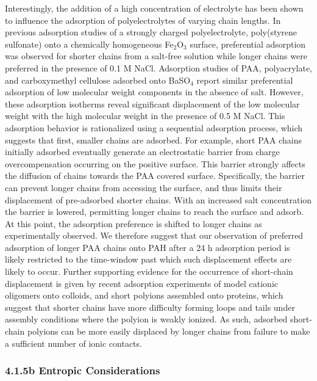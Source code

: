 \documentclass[journal=mamobx,manuscript=article]{achemso}
\begin{document}
Interestingly, the addition of a high concentration of electrolyte has been shown to influence the adsorption of polyelectrolytes of varying chain lengths.  In previous adsorption studies of a strongly charged polyelectrolyte, poly(styrene sulfonate) onto a chemically homogeneous Fe$_2$O$_3$ surface, preferential adsorption was observed for shorter chains from a salt-free solution while longer chains were preferred in the presence of 0.1 M NaCl.\cite{Ramachandran1987,Ramachandran1988}  Adsorption studies of PAA,\cite{Wright1987} polyacrylate,\cite{Bain1982} and carboxymethyl cellulose\cite{Bain1982} adsorbed onto BaSO$_4$ report similar preferential adsorption of low molecular weight components in the absence of salt.  However, these adsorption isotherms reveal significant displacement of the low molecular weight with the high molecular weight in the presence of 0.5 M NaCl.\cite{Bain1982} This adsorption behavior is rationalized using a sequential adsorption process, which suggests that first, smaller chains are adsorbed.\cite{DeLaat1995}  For example, short PAA chains initially adsorbed eventually generate an electrostatic barrier from charge overcompensation occurring on the positive surface.  This barrier strongly affects the diffusion of chains towards the PAA covered surface.  Specifically, the barrier can prevent longer chains from accessing the surface, and thus limits their displacement of pre-adsorbed shorter chains.  With an increased salt concentration the barrier is lowered, permitting longer chains to reach the surface and adsorb.  At this point, the adsorption preference is shifted to longer chains as experimentally observed.\cite{DeLaat1995}  We therefore suggest that our observation of preferred adsorption of longer PAA chains onto PAH after a 24 h adsorption period is likely restricted to the time-window past which such displacement effects are likely to occur.  Further supporting evidence for the occurrence of short-chain displacement is given by recent adsorption experiments of model cationic oligomers onto colloids,\cite{Shin2001} and short polyions assembled onto proteins,\cite{Houska2004} which suggest that shorter chains have more difficulty forming loops and tails under assembly conditions where the polyion is weakly ionized.  As such, adsorbed short-chain polyions can be more easily displaced by longer chains from failure to make a sufficient number of ionic contacts.  

\subsubsection{4.1.5b Entropic Considerations}
\end{document}
